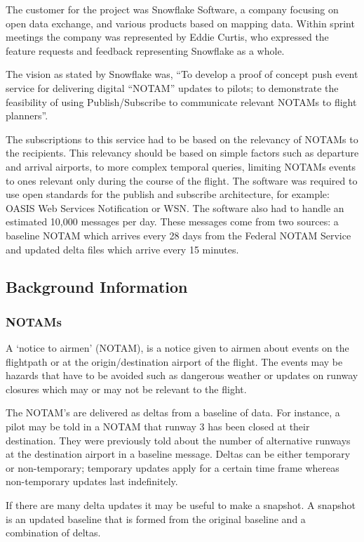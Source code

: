 \documentclass[a4paper, 12pt]{article}
\begin{document}
The customer for the project was Snowflake Software, a company focusing on open data exchange, and various products based on mapping data. Within sprint meetings the company was represented by Eddie Curtis, who expressed the feature requests and feedback representing Snowflake as a whole.

The vision as stated by Snowflake was, “To develop a proof of concept push event service for delivering digital “NOTAM” updates to pilots; to demonstrate the feasibility of using Publish/Subscribe to communicate relevant NOTAMs to flight planners”.

The subscriptions to this service had to be based on the relevancy of NOTAMs to the recipients. This relevancy should be based on simple factors such as departure and arrival airports, to more complex temporal queries, limiting NOTAMs events to ones relevant only during the course of the flight. The software was required to use open standards for the publish and subscribe architecture, for example: OASIS Web Services Notification or WSN. The software also had to handle an estimated 10,000 messages per day. These messages come from two sources: a baseline NOTAM which arrives every 28 days from the Federal NOTAM Service and updated delta files which arrive every 15 minutes. 

\subsection{Background Information}

\subsubsection{NOTAMs}
A ‘notice to airmen’ (NOTAM), is a notice given to airmen about events on the flightpath or at the origin/destination airport of the flight. The events may be hazards that have to be avoided such as dangerous weather or updates on runway closures which may or may not be relevant to the flight.

The NOTAM’s are delivered as deltas from a baseline of data. For instance, a pilot may be told in a NOTAM that runway 3 has been closed at their destination. They were previously told about the number of alternative runways at the destination airport in a baseline message. Deltas can be either temporary or non-temporary; temporary updates apply for a certain time frame whereas non-temporary updates last indefinitely.

If there are many delta updates it may be useful to make a snapshot. A snapshot is an updated baseline that is formed from the original baseline and a combination of deltas.
\end{document}
